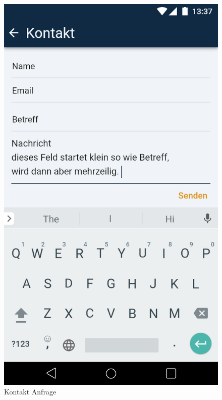 \begin{figure}[h]
	\includegraphics[scale = 0.22]{img/AndroidMockup/contact}		
	\caption{Kontakt Anfrage}
	\label{fig:mock-pw}
\end{figure}

